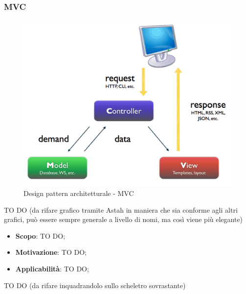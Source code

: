 		\subsubsection{MVC} %
		\begin{figure}[htbp]
			\centering
			\centerline{\includegraphics[scale=0.6]{./images/mvc.png}}
			\caption{Design pattern architetturale - MVC}
		\end{figure}
		TO DO (da rifare grafico tramite Astah in maniera che sia conforme agli altri grafici, può essere sempre generale a livello di nomi, ma così viene più elegante)

		\begin{itemize}
			\item \textbf{Scopo}: TO DO;
			\item \textbf{Motivazione}: TO DO;
			\item \textbf{Applicabilità}: TO DO;
		\end{itemize}

		TO DO (da rifare inquadrandolo sullo scheletro sovrastante) \newline

